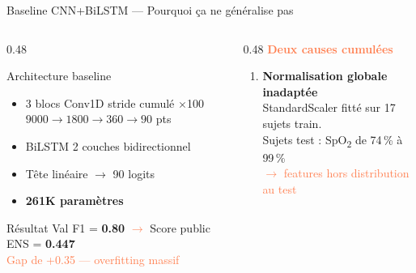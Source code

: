 \documentclass[aspectratio=169, 10pt]{beamer}
\begin{document}
\begin{frame}{Baseline CNN+BiLSTM — Pourquoi ça ne généralise pas}
    \begin{columns}[T]
        \begin{column}{0.48\textwidth}
            \begin{block}{\small Architecture baseline}
                \small
                \begin{itemize}\setlength\itemsep{2pt}
                    \item 3 blocs Conv1D stride cumulé $\times$100\\
                          $9000 \to 1800 \to 360 \to 90$ pts
                    \item BiLSTM 2 couches bidirectionnel
                    \item Tête linéaire $\to$ 90 logits
                    \item \textbf{261K paramètres}
                \end{itemize}
            \end{block}
            \vspace{0.2cm}
            \begin{alertblock}{\small Résultat}
                \small
                Val F1 = \textbf{0.80} \;\textcolor{Coral}{$\longrightarrow$}\;
                Score public ENS = \textbf{0.447}\\[2pt]
                \textcolor{Coral}{Gap de +0.35 — overfitting massif}
            \end{alertblock}
        \end{column}
        \begin{column}{0.48\textwidth}
            \small\textbf{\textcolor{Coral}{Deux causes cumulées}}
            \vspace{0.15cm}
            \begin{enumerate}\setlength\itemsep{6pt}\small
                \item \textbf{Normalisation globale inadaptée}\\
                      StandardScaler fitté sur 17 sujets train.\\
                      Sujets test : SpO\textsubscript{2} de 74\,\% à 99\,\%\\
                      \textcolor{Coral}{$\to$ features hors distribution au test}


\end{enumerate}
\end{column}
\end{columns}
\end{frame}
\end{document}
